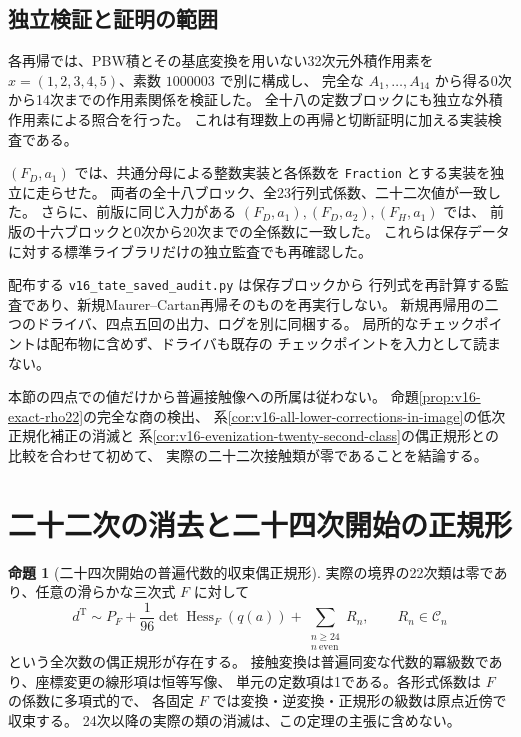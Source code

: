 \documentclass[a4paper,11pt]{ltjsarticle}
\theoremstyle{definition}
\newtheorem{theorem}{命題}[section]
\begin{document}
\subsection{独立検証と証明の範囲}

各再帰では、PBW積とその基底変換を用いない32次元外積作用素を
$x=(1,2,3,4,5)$、素数 $1000003$ で別に構成し、
完全な $A_1,\ldots,A_{14}$ から得る0次から14次までの作用素関係を検証した。
全十八の定数ブロックにも独立な外積作用素による照合を行った。
これは有理数上の再帰と切断証明に加える実装検査である。

$(F_D,a_1)$ では、共通分母による整数実装と各係数を
\texttt{Fraction} とする実装を独立に走らせた。
両者の全十八ブロック、全23行列式係数、二十二次値が一致した。
さらに、前版に同じ入力がある $(F_D,a_1),(F_D,a_2),(F_H,a_1)$ では、
前版の十六ブロックと0次から20次までの全係数に一致した。
これらは保存データに対する標準ライブラリだけの独立監査でも再確認した。

配布する \texttt{v16\_tate\_saved\_audit.py} は保存ブロックから
行列式を再計算する監査であり、新規Maurer--Cartan再帰そのものを再実行しない。
新規再帰用の二つのドライバ、四点五回の出力、ログを別に同梱する。
局所的なチェックポイントは配布物に含めず、ドライバも既存の
チェックポイントを入力として読まない。

本節の四点での値だけから普遍接触像への所属は従わない。
命題\ref{prop:v16-exact-rho22}の完全な商の検出、
系\ref{cor:v16-all-lower-corrections-in-image}の低次正規化補正の消滅と
系\ref{cor:v16-evenization-twenty-second-class}の偶正規形との比較を合わせて初めて、
実際の二十二次接触類が零であることを結論する。




\section{二十二次の消去と二十四次開始の正規形}
\label{sec:v16-twenty-fourth-normal-form}

\begin{theorem}[二十四次開始の普遍代数的収束偶正規形]
\label{thm:v16-twenty-fourth-normal-form}
実際の境界の22次類は零であり、任意の滑らかな三次式 $F$ に対して
\begin{equation}\label{eq:v16-twenty-fourth-normal-form}
 \boxed{\displaystyle
 d^{\mathrm T}\sim
 P_F+\frac1{96}\det\operatorname{Hess}_F(q(a))
       +\sum_{\substack{n\ge24\\n\ \mathrm{even}}}R_n,
 \qquad R_n\in\mathcal C_n}
\end{equation}
という全次数の偶正規形が存在する。
接触変換は普遍同変な代数的冪級数であり、座標変更の線形項は恒等写像、
単元の定数項は1である。各形式係数は $F$ の係数に多項式的で、
各固定 $F$ では変換・逆変換・正規形の級数は原点近傍で収束する。
24次以降の実際の類の消滅は、この定理の主張に含めない。
\end{theorem}
\end{document}
